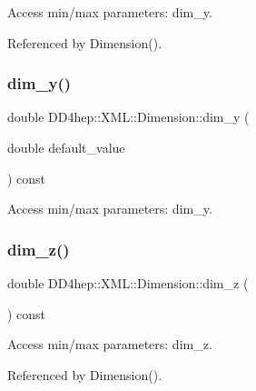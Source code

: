 Access min/max parameters\+: dim\+\_\+y. 



Referenced by Dimension().

\hypertarget{struct_d_d4hep_1_1_x_m_l_1_1_dimension_ad693522df5b2d13bee55d8bfc4ae1373}{}\label{struct_d_d4hep_1_1_x_m_l_1_1_dimension_ad693522df5b2d13bee55d8bfc4ae1373} 
\subsubsection{\texorpdfstring{dim\+\_\+y()}{dim\_y()}\hspace{0.1cm}{\footnotesize\ttfamily [2/2]}}
{\footnotesize\ttfamily double D\+D4hep\+::\+X\+M\+L\+::\+Dimension\+::dim\+\_\+y (\begin{DoxyParamCaption}\item[{double}]{default\+\_\+value }\end{DoxyParamCaption}) const}



Access min/max parameters\+: dim\+\_\+y. 

\hypertarget{struct_d_d4hep_1_1_x_m_l_1_1_dimension_a4cba6e963013ca4c4f2fd6b4218e9a6f}{}\label{struct_d_d4hep_1_1_x_m_l_1_1_dimension_a4cba6e963013ca4c4f2fd6b4218e9a6f} 
\subsubsection{\texorpdfstring{dim\+\_\+z()}{dim\_z()}\hspace{0.1cm}{\footnotesize\ttfamily [1/2]}}
{\footnotesize\ttfamily double D\+D4hep\+::\+X\+M\+L\+::\+Dimension\+::dim\+\_\+z (\begin{DoxyParamCaption}{ }\end{DoxyParamCaption}) const}



Access min/max parameters\+: dim\+\_\+z. 



Referenced by Dimension().

\hypertarget{struct_d_d4hep_1_1_x_m_l_1_1_dimension_a3a76f6f77e342146e9cc3548325355fa}{}\label{struct_d_d4hep_1_1_x_m_l_1_1_dimension_a3a76f6f77e342146e9cc3548325355fa} 
